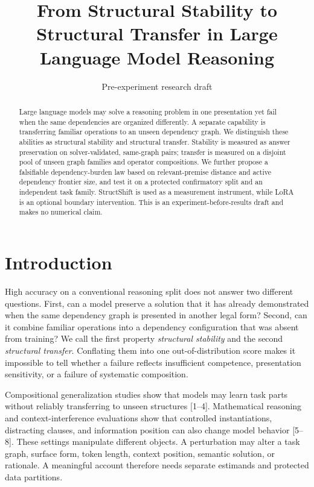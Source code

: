 \documentclass[11pt,a4paper]{article}
\title{From Structural Stability to Structural Transfer in Large Language Model Reasoning}
\author{}
\date{Pre-experiment research draft}
\theoremstyle{plain}
\begin{document}
\maketitle

\begin{abstract}
Large language models may solve a reasoning problem in one presentation yet
fail when the same dependencies are organized differently. A separate
capability is transferring familiar operations to an unseen dependency graph.
We distinguish these abilities as structural stability and structural transfer.
Stability is measured as answer preservation on solver-validated, same-graph
pairs; transfer is measured on a disjoint pool of unseen graph families and
operator compositions. We further propose a falsifiable dependency-burden law
based on relevant-premise distance and active dependency frontier size, and test
it on a protected confirmatory split and an independent task family. StructShift
is used as a measurement instrument, while LoRA is an optional boundary
intervention. This is an experiment-before-results draft and makes no numerical
claim.
\end{abstract}

\section{Introduction}

High accuracy on a conventional reasoning split does not answer two different
questions. First, can a model preserve a solution that it has already
demonstrated when the same dependency graph is presented in another legal
form? Second, can it combine familiar operations into a dependency
configuration that was absent from training? We call the first property
\emph{structural stability} and the second \emph{structural transfer}.
Conflating them into one out-of-distribution score makes it impossible to tell
whether a failure reflects insufficient competence, presentation sensitivity,
or a failure of systematic composition.

Compositional generalization studies show that models may learn task parts
without reliably transferring to unseen structures [1--4]. Mathematical
reasoning and context-interference evaluations show that controlled
instantiations, distracting clauses, and information position can also change
model behavior [5--8]. These settings manipulate different objects. A
perturbation may alter a task graph, surface form, token length, context
position, semantic solution, or rationale. A meaningful account therefore needs
separate estimands and protected data partitions.
\end{document}
